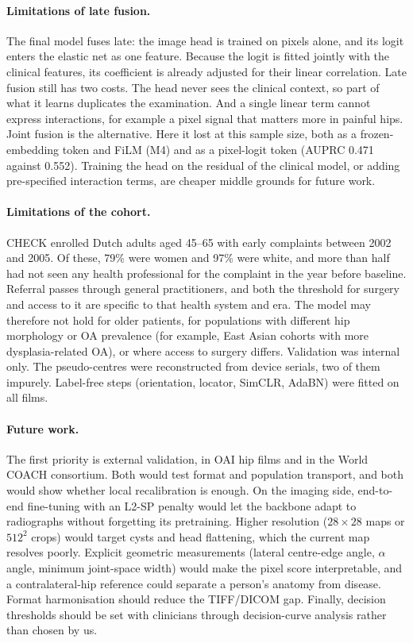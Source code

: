 \paragraph{Limitations of late fusion.}
The final model fuses late: the image head is trained on pixels alone, and its logit enters the elastic net as one
feature. Because the logit is fitted jointly with the clinical features, its coefficient is already adjusted for
their linear correlation. Late fusion still has two costs. The head never sees the clinical context, so part of what
it learns duplicates the examination. And a single linear term cannot express interactions, for example a pixel
signal that matters more in painful hips. Joint fusion is the alternative. Here it lost at this sample size, both as a
frozen-embedding token and FiLM (M4) and as a pixel-logit token (AUPRC 0.471 against 0.552). Training the head on the
residual of the clinical model, or adding pre-specified interaction terms, are cheaper middle grounds for future work.

\paragraph{Limitations of the cohort.}
CHECK enrolled Dutch adults aged 45--65 with early complaints between 2002 and 2005. Of these, 79\% were women and 97\%
were white, and more than half had not seen any health professional for the complaint in the year before baseline.
Referral passes through general practitioners, and both the threshold for surgery and access to it are specific to
that health system and era. The model may therefore not hold for older patients, for populations with different hip
morphology or OA prevalence (for example, East Asian cohorts with more dysplasia-related OA), or where access to
surgery differs. Validation was internal only. The pseudo-centres were reconstructed from device serials, two of them
impurely. Label-free steps (orientation, locator, SimCLR, AdaBN) were fitted on all films.

\paragraph{Future work.}
The first priority is external validation, in OAI hip films and in the World COACH consortium. Both would test format
and population transport, and both would show whether local recalibration is enough. On the imaging side, end-to-end
fine-tuning with an L2-SP penalty would let the backbone adapt to radiographs without forgetting its pretraining.
Higher resolution ($28\times28$ maps or $512^2$ crops) would target cysts and head flattening, which the current map
resolves poorly. Explicit geometric measurements (lateral centre-edge angle, $\alpha$ angle, minimum joint-space width)
would make the pixel score interpretable, and a contralateral-hip reference could separate a person's anatomy from
disease. Format harmonisation should reduce the TIFF/DICOM gap. Finally, decision thresholds should be set with
clinicians through decision-curve analysis rather than chosen by us.

